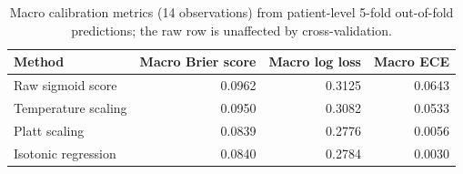 \begin{table}[t]
\centering
\small
\begin{tabular}{lrrr}
\hline
Method & Macro Brier score & Macro log loss & Macro ECE \\
\hline
Raw sigmoid score & 0.0962 & 0.3125 & 0.0643 \\
Temperature scaling & 0.0950 & 0.3082 & 0.0533 \\
Platt scaling & 0.0839 & 0.2776 & 0.0056 \\
Isotonic regression & 0.0840 & 0.2784 & 0.0030 \\
\hline
\end{tabular}
\caption{Macro calibration metrics (14 observations) from patient-level 5-fold out-of-fold predictions; the raw row is unaffected by cross-validation.}
\label{tab:table1_calibration_method_comparison}
\end{table}
